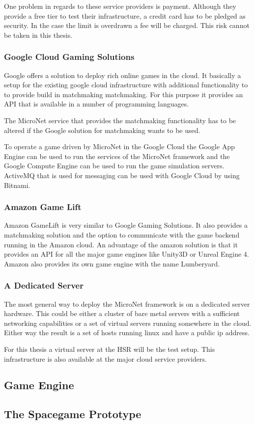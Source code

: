 One problem in regards to these service providers is payment. Although they
provide a free tier to test their infrastructure, a credit card has to be
pledged as security. In the case the limit is overdrawn a fee will be charged.
This risk cannot be taken in this thesis. 

\subsubsection{Google Cloud Gaming Solutions}

Google offers a solution to deploy rich online games in the cloud. It basically
a setup for the existing google cloud infrastructure with additional
functionality to to provide build in matchmaking matchmaking. For this purpose
it provides an API that is available in a number of programming languages.

The MicroNet service that provides the matchmaking functionality has to be
altered if the Google solution for matchmaking wants to be used. 

To operate a game driven by MicroNet in the Google Cloud the Google App Engine
can be used to run the services of the MicroNet framework and the Google Compute
Engine can be used to run the game simulation servers. ActiveMQ that is used for
messaging can be used with Google Cloud by using Bitnami.

\subsubsection{Amazon Game Lift}

Amazon GameLift is very similar to Google Gaming Solutions. It also provides a
matchmaking solution and the option to communicate with the game backend running
in the Amazon cloud. An advantage of the amazon solution is that it provides an
API for all the major game engines like Unity3D or Unreal Engine 4. Amazon also
provides its own game engine with the name Lumberyard.

\subsubsection{A Dedicated Server}

The most general way to deploy the MicroNet framework is on a dedicated server
hardware. This could be either a cluster of bare metal servers with a sufficient
networking capabilities or a set of virtual servers running somewhere in the
cloud. Either way the result is a set of hosts running linux and have a public
ip address.

For this thesis a virtual server at the HSR will be the test setup. This
infrastructure is also available at the major cloud service providers.



\subsection{Game Engine}

\subsection{The Spacegame Prototype}

